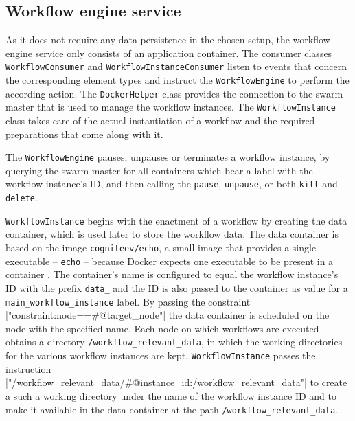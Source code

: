   \subsection{Workflow engine service} %
    \label{sub:workflow_engine_service}
    As it does not require any data persistence in the chosen setup, the workflow engine service only consists of an application container. The consumer classes \texttt{WorkflowConsumer} and \texttt{WorkflowInstanceConsumer} listen to events that concern the corresponding element types and instruct the \texttt{WorkflowEngine} to perform the according action. The \texttt{DockerHelper} class provides the connection to the swarm master that is used to manage the workflow instances.
    The \texttt{WorkflowInstance} class takes care of the actual instantiation of a workflow and the required preparations that come along with it.

    The \texttt{WorkflowEngine} pauses, unpauses or terminates a workflow instance, by querying the swarm master for all containers which bear a label with the workflow instance's \ac{ID}, and then calling the  \texttt{pause}, \texttt{unpause}, or both \texttt{kill} and \texttt{delete}.

    \texttt{WorkflowInstance} begins with the enactment of a workflow by creating the data container, which is used later to store the workflow data. The data container is based on the image \texttt{cogniteev/echo}, a small image that provides a single executable -- \texttt{echo} -- because Docker expects one executable to be present in a container \cite{Cogniteev2015Docker}. The container's name is configured to equal the workflow instance's \ac{ID} with the prefix \texttt{data\_} and the \ac{ID} is also passed to the container as value for a \texttt{main\_workflow\_instance} label.
    By passing the constraint
    |"constraint:node==#{@target_node}"|
    the data container is scheduled on the node with the specified name. Each node on which workflows are executed obtains a directory \texttt{/workflow\_relevant\_data}, in which the working directories for the various workflow instances are kept. \texttt{WorkflowInstance} passes the instruction
    |"/workflow_relevant_data/#{@instance_id}:/workflow_relevant_data"|
    to create a such a working directory under the name of the workflow instance \ac{ID} and to make it available in the data container at the path \texttt{/workflow\_relevant\_data}.

